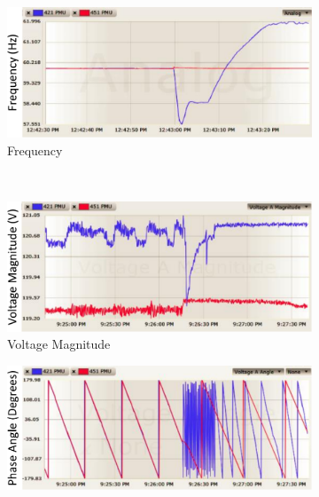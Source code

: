 \begin{figure}[tp]
	\centering
    \begin{subfigure}[b]{0.42\textwidth}
    	\centering
	\includegraphics[width=1\textwidth]{figures/attack2-1-1}
        \vspace{-0.15in}
        \caption{Frequency}
		\label{fig:attack2-1}
	\end{subfigure}
~\qquad
	\begin{subfigure}[b]{0.42\textwidth}
    	\centering
	\includegraphics[width=1\textwidth]{figures/attack2-2}
        \vspace{-0.15in}
        \caption{Voltage Magnitude}
		\label{fig:attack2-2}
	\end{subfigure}
	\begin{subfigure}[b]{0.42\textwidth}
    	\centering
	\includegraphics[width=1\textwidth]{figures/attack2-3}
        \vspace{-0.15in}

\end{subfigure}
\end{figure}
